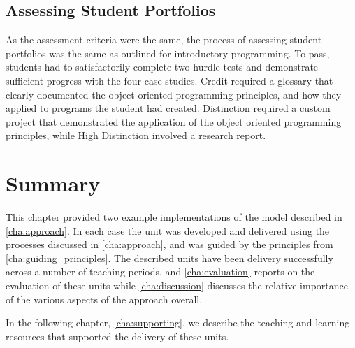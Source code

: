 
\subsection{Assessing Student Portfolios} %
\label{sub:oop_assessing_student_portfolios}

As the assessment criteria were the same, the process of assessing student portfolios was the same as outlined for introductory programming. To pass, students had to satisfactorily complete two hurdle tests and demonstrate sufficient progress with the four case studies. Credit required a glossary that clearly documented the object oriented programming principles, and how they applied to programs the student had created. Distinction required a custom project that demonstrated the application of the object oriented programming principles, while High Distinction involved a research report.






\section{Summary} %
\label{sec:ca_intro_summary}

This chapter provided two example implementations of the model described in \cref{cha:approach}. In each case the unit was developed and delivered using the processes discussed in \cref{cha:approach}, and was guided by the principles from \cref{cha:guiding_principles}. The described units have been delivery successfully across a number of teaching periods, and \cref{cha:evaluation} reports on the evaluation of these units while \cref{cha:discussion} discusses the relative importance of the various aspects of the approach overall.

In the following chapter, \cref{cha:supporting}, we describe the teaching and learning resources that supported the delivery of these units.


